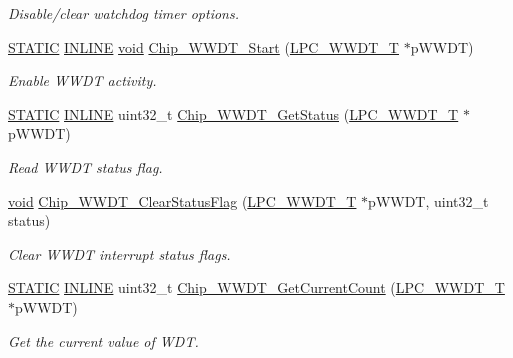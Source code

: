 \begin{DoxyCompactItemize}
\begin{DoxyCompactList}\small\item\em Disable/clear watchdog timer options. \end{DoxyCompactList}\item 
\hyperlink{group__LPC__Types__Public__Macros_ga10b2d890d871e1489bb02b7e70d9bdfb}{S\-T\-A\-T\-I\-C} \hyperlink{group__LPC__Types__Public__Types_ga2eb6f9e0395b47b8d5e3eeae4fe0c116}{I\-N\-L\-I\-N\-E} \hyperlink{Paradigm_2Tern__EE_2small_2portmacro_8h_a14d32f8130d3c0b212cfc751730b5b49}{void} \hyperlink{group__WWDT__17XX__40XX_gacae3a80bfc9430604c434d073230f577}{Chip\-\_\-\-W\-W\-D\-T\-\_\-\-Start} (\hyperlink{structLPC__WWDT__T}{L\-P\-C\-\_\-\-W\-W\-D\-T\-\_\-\-T} $\ast$p\-W\-W\-D\-T)
\begin{DoxyCompactList}\small\item\em Enable W\-W\-D\-T activity. \end{DoxyCompactList}\item 
\hyperlink{group__LPC__Types__Public__Macros_ga10b2d890d871e1489bb02b7e70d9bdfb}{S\-T\-A\-T\-I\-C} \hyperlink{group__LPC__Types__Public__Types_ga2eb6f9e0395b47b8d5e3eeae4fe0c116}{I\-N\-L\-I\-N\-E} uint32\-\_\-t \hyperlink{group__WWDT__17XX__40XX_ga9e5a34151326049c5485bb20c9f36fee}{Chip\-\_\-\-W\-W\-D\-T\-\_\-\-Get\-Status} (\hyperlink{structLPC__WWDT__T}{L\-P\-C\-\_\-\-W\-W\-D\-T\-\_\-\-T} $\ast$p\-W\-W\-D\-T)
\begin{DoxyCompactList}\small\item\em Read W\-W\-D\-T status flag. \end{DoxyCompactList}\item 
\hyperlink{Paradigm_2Tern__EE_2small_2portmacro_8h_a14d32f8130d3c0b212cfc751730b5b49}{void} \hyperlink{group__WWDT__17XX__40XX_ga6e6453450170638f554e7ba3c548ec4a}{Chip\-\_\-\-W\-W\-D\-T\-\_\-\-Clear\-Status\-Flag} (\hyperlink{structLPC__WWDT__T}{L\-P\-C\-\_\-\-W\-W\-D\-T\-\_\-\-T} $\ast$p\-W\-W\-D\-T, uint32\-\_\-t status)
\begin{DoxyCompactList}\small\item\em Clear W\-W\-D\-T interrupt status flags. \end{DoxyCompactList}\item 
\hyperlink{group__LPC__Types__Public__Macros_ga10b2d890d871e1489bb02b7e70d9bdfb}{S\-T\-A\-T\-I\-C} \hyperlink{group__LPC__Types__Public__Types_ga2eb6f9e0395b47b8d5e3eeae4fe0c116}{I\-N\-L\-I\-N\-E} uint32\-\_\-t \hyperlink{group__WWDT__17XX__40XX_ga4b1c8d2f48a8397d63c1c3c74dc7e82a}{Chip\-\_\-\-W\-W\-D\-T\-\_\-\-Get\-Current\-Count} (\hyperlink{structLPC__WWDT__T}{L\-P\-C\-\_\-\-W\-W\-D\-T\-\_\-\-T} $\ast$p\-W\-W\-D\-T)
\begin{DoxyCompactList}\small\item\em Get the current value of W\-D\-T. \end{DoxyCompactList}\end{DoxyCompactItemize}


